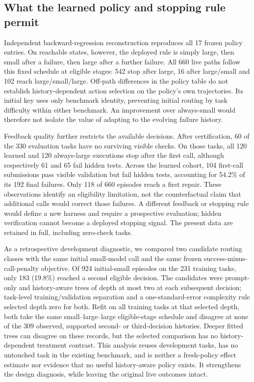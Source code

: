 \subsection{What the learned policy and stopping rule permit}
Independent backward-regression reconstruction reproduces all 17 frozen policy entries. On reachable states,
however, the deployed rule is simply large, then small after a failure, then large after a further failure.
All 660 live paths follow this fixed schedule at eligible stages: 542 stop after large, 16 after large/small and
102 reach large/small/large. Off-path differences in the policy table do not establish history-dependent action
selection on the policy's own trajectories. Its initial key uses only benchmark identity, preventing initial
routing by task difficulty within either benchmark. An improvement over always-small would therefore not isolate
the value of adapting to the evolving failure history.

Feedback quality further restricts the available decisions. After certification, 60 of the 330 evaluation tasks
have no surviving visible checks. On those tasks, all 120 learned and 120 always-large executions stop after
the first call, although respectively 61 and 65 fail hidden tests. Across the learned cohort, 104 first-call
submissions pass visible validation but fail hidden tests, accounting for 54.2\% of its 192 final failures.
Only 118 of 660 episodes reach a first repair. These observations identify an eligibility limitation, not the
counterfactual claim that additional calls would correct those failures. A different feedback or stopping rule
would define a new harness and require a prospective evaluation; hidden verification cannot become a deployed
stopping signal. The present data are retained in full, including zero-check tasks.

As a retrospective development diagnostic, we compared two candidate routing classes with the same initial
small-model call and the same frozen success-minus-call-penalty objective. Of 924 initial-small episodes on the
231 training tasks, only 183 (19.8\%) reached a second eligible decision. The candidates were prompt-only and
history-aware trees of depth at most two at each subsequent decision; task-level training/validation separation
and a one-standard-error complexity rule selected depth zero for both. Refit on all training tasks at that selected
depth, both take the same small--large--large eligible-stage schedule and disagree at none of the 309 observed,
supported second- or third-decision histories. Deeper fitted trees can disagree on these records, but the selected
comparison has no history-dependent treatment contrast. This analysis reuses development tasks, has no untouched
task in the existing benchmark, and is neither a fresh-policy effect estimate nor evidence that no useful
history-aware policy exists. It strengthens the design diagnosis, while leaving the original live outcomes intact.

